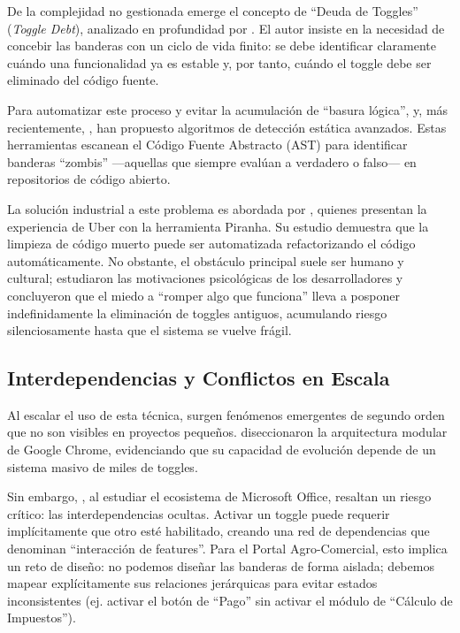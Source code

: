 De la complejidad no gestionada emerge el concepto de ``Deuda de Toggles'' (\textit{Toggle Debt}), analizado en profundidad por \cite{ortiz2021toggledebt}. El autor insiste en la necesidad de concebir las banderas con un ciclo de vida finito: se debe identificar claramente cuándo una funcionalidad ya es estable y, por tanto, cuándo el toggle debe ser eliminado del código fuente.

Para automatizar este proceso y evitar la acumulación de ``basura lógica'', \cite{li2020capture} y, más recientemente, \cite{wang2025tsdetector}, han propuesto algoritmos de detección estática avanzados. Estas herramientas escanean el Código Fuente Abstracto (AST) para identificar banderas ``zombis'' —aquellas que siempre evalúan a verdadero o falso— en repositorios de código abierto.

La solución industrial a este problema es abordada por \cite{sridharan2020piranha}, quienes presentan la experiencia de Uber con la herramienta Piranha. Su estudio demuestra que la limpieza de código muerto puede ser automatizada refactorizando el código automáticamente. No obstante, el obstáculo principal suele ser humano y cultural; \cite{abdalkareem2021removal} estudiaron las motivaciones psicológicas de los desarrolladores y concluyeron que el miedo a ``romper algo que funciona'' lleva a posponer indefinidamente la eliminación de toggles antiguos, acumulando riesgo silenciosamente hasta que el sistema se vuelve frágil.

\subsection{Interdependencias y Conflictos en Escala}

Al escalar el uso de esta técnica, surgen fenómenos emergentes de segundo orden que no son visibles en proyectos pequeños. \cite{rahman2019chrome} diseccionaron la arquitectura modular de Google Chrome, evidenciando que su capacidad de evolución depende de un sistema masivo de miles de toggles.

Sin embargo, \cite{smith2022interdependencies}, al estudiar el ecosistema de Microsoft Office, resaltan un riesgo crítico: las interdependencias ocultas. Activar un toggle puede requerir implícitamente que otro esté habilitado, creando una red de dependencias que \cite{hal2022interaction} denominan ``interacción de features''. Para el Portal Agro-Comercial, esto implica un reto de diseño: no podemos diseñar las banderas de forma aislada; debemos mapear explícitamente sus relaciones jerárquicas para evitar estados inconsistentes (ej. activar el botón de ``Pago'' sin activar el módulo de ``Cálculo de Impuestos'').

